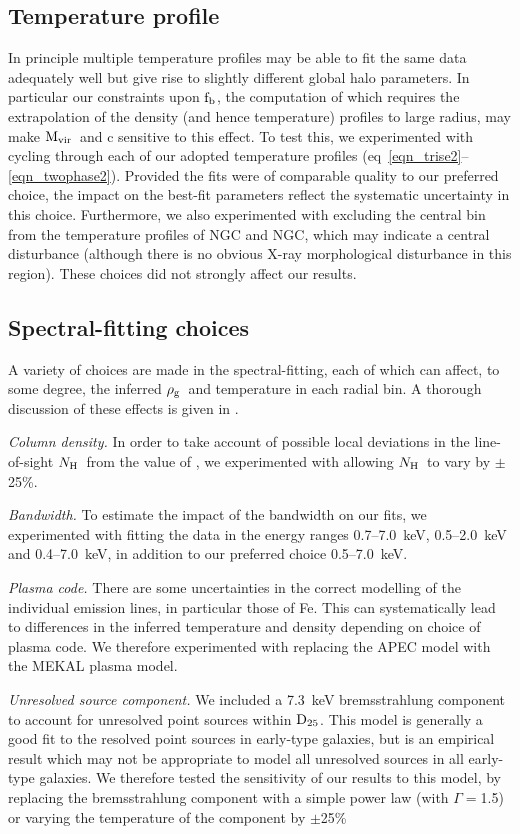 \documentclass{emulateapj}
\def \nh {N${\rm _H}$}
\def \nh {$N_{\rm H}$}
\def \dtwentyfive {${\rm D_{25}}$}
\newcommand{\rhog}{${\rm \rho_g}$}
\newcommand{\mvir}{${\rm M_{vir}}$}
\newcommand{\fbaryons}{${\rm f_{b}}$}
\newcommand{\thin}{\thinspace}
\begin{document}
\subsection{Temperature profile}
In principle multiple temperature profiles may be able to fit the 
same data adequately well but give rise to slightly different
global halo parameters. In particular our constraints upon 
\fbaryons, the computation of which requires the  extrapolation of the density 
(and hence temperature) profiles to large radius, may make 
\mvir\ and c sensitive to this effect. To test this, we 
experimented with cycling through each of our adopted temperature profiles
(eq~\ref{eqn_trise2}--\ref{eqn_twophase2}). Provided the fits
were of comparable quality to our preferred choice, the impact on
the best-fit parameters reflect the systematic uncertainty in this 
choice. Furthermore, we also experimented with excluding the central
bin from the temperature profiles of NGC\thin 1407 and NGC\thin 4649,
which may indicate a central disturbance (although there is no
obvious X-ray morphological disturbance in this region).
These choices did not strongly affect our results.

\subsection{Spectral-fitting choices} \label{sect_systematics_spectra}
A variety of choices are made in the spectral-fitting, each of 
which can affect, to some degree, the inferred \rhog\ and temperature
in each radial bin. A thorough discussion of these 
effects is given in \citet{humphrey05a}.

{\em Column density.} In order to take account of possible
local deviations in the line-of-sight \nh\ from the value
of \citet{dickey90}, we experimented with allowing \nh\ to vary
by $\pm$25\%.

{\em Bandwidth.} To estimate the impact of the bandwidth on
our fits, we experimented with fitting the data in the energy
ranges 0.7--7.0~keV, 0.5--2.0~keV and 0.4--7.0~keV, in addition
to our preferred choice 0.5--7.0~keV.

{\em Plasma code.} There are some uncertainties in the correct
modelling of the individual emission lines, in particular those of Fe. This
can systematically lead to differences in the inferred temperature
and density depending on choice of plasma code. We therefore 
experimented with replacing the APEC model with the MEKAL plasma model.

{\em Unresolved source component.} We included a 7.3~keV bremsstrahlung
component to account for unresolved point sources 
within \dtwentyfive. This model is generally a good fit to the
resolved point sources in early-type galaxies, but is an 
empirical result which may not be appropriate to model
all unresolved sources in all early-type galaxies. We therefore 
tested the sensitivity of our results 
to this model, by replacing the bremsstrahlung component
with a simple power law (with $\Gamma=$1.5) or varying the temperature
of the component by $\pm$25\% %
\end{document}
